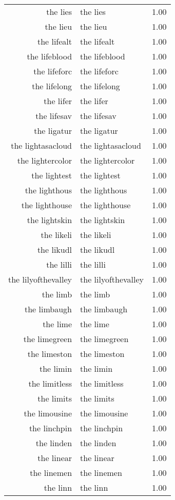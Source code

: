 \begin{table}[ht]
\begin{tabular}{rlr}
  the lies & the lies & 1.00 \\ 
  the lieu & the lieu & 1.00 \\ 
  the lifealt & the lifealt & 1.00 \\ 
  the lifeblood & the lifeblood & 1.00 \\ 
  the lifeforc & the lifeforc & 1.00 \\ 
  the lifelong & the lifelong & 1.00 \\ 
  the lifer & the lifer & 1.00 \\ 
  the lifesav & the lifesav & 1.00 \\ 
  the ligatur & the ligatur & 1.00 \\ 
  the lightasacloud & the lightasacloud & 1.00 \\ 
  the lightercolor & the lightercolor & 1.00 \\ 
  the lightest & the lightest & 1.00 \\ 
  the lighthous & the lighthous & 1.00 \\ 
  the lighthouse & the lighthouse & 1.00 \\ 
  the lightskin & the lightskin & 1.00 \\ 
  the likeli & the likeli & 1.00 \\ 
  the likudl & the likudl & 1.00 \\ 
  the lilli & the lilli & 1.00 \\ 
  the lilyofthevalley & the lilyofthevalley & 1.00 \\ 
  the limb & the limb & 1.00 \\ 
  the limbaugh & the limbaugh & 1.00 \\ 
  the lime & the lime & 1.00 \\ 
  the limegreen & the limegreen & 1.00 \\ 
  the limeston & the limeston & 1.00 \\ 
  the limin & the limin & 1.00 \\ 
  the limitless & the limitless & 1.00 \\ 
  the limits & the limits & 1.00 \\ 
  the limousine & the limousine & 1.00 \\ 
  the linchpin & the linchpin & 1.00 \\ 
  the linden & the linden & 1.00 \\ 
  the linear & the linear & 1.00 \\ 
  the linemen & the linemen & 1.00 \\ 
  the linn & the linn & 1.00 \\ 

\end{tabular}
\end{table}
